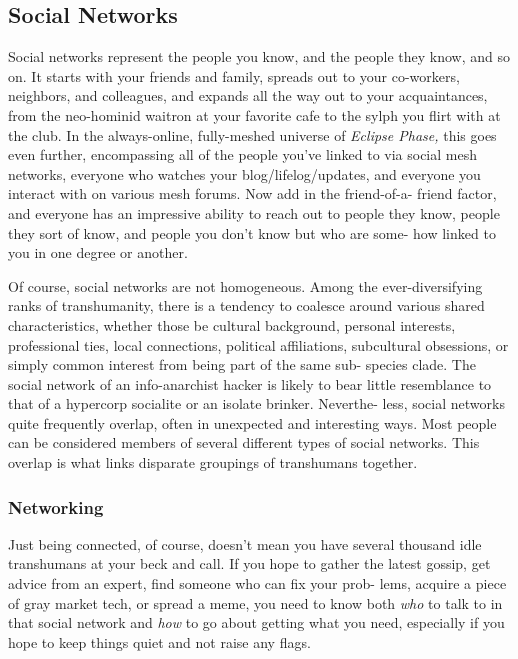 \subsection{Social Networks}

Social networks represent the people you know, and 
the people they know, and so on. It starts with your 
friends and family, spreads out to your co-workers, 
neighbors, and colleagues, and expands all the way 
out to your acquaintances, from the neo-hominid 
waitron at your favorite cafe to the sylph you flirt 
with at the club. In the always-online, fully-meshed 
universe of \textit{Eclipse Phase,} this goes even further, 
encompassing all of the people you've linked to via 
social mesh networks, everyone who watches your 
blog/lifelog/updates, and everyone you interact with 
on various mesh forums. Now add in the friend-of-a-
friend factor, and everyone has an impressive ability 
to reach out to people they know, people they sort of 
know, and people you don't know but who are some-
how linked to you in one degree or another.

Of course, social networks are not homogeneous. 
Among the ever-diversifying ranks of transhumanity, 
there is a tendency to coalesce around various shared 
characteristics, whether those be cultural background, 
personal interests, professional ties, local connections, 
political affiliations, subcultural obsessions, or simply 
common interest from being part of the same sub-
species clade. The social network of an info-anarchist 
hacker is likely to bear little resemblance to that of 
a hypercorp socialite or an isolate brinker. Neverthe-
less, social networks quite frequently overlap, often 
in unexpected and interesting ways. Most people can 
be considered members of several different types of 
social networks. This overlap is what links disparate 
groupings of transhumans together.

\subsubsection{Networking}

Just being connected, of course, doesn't mean you have 
several thousand idle transhumans at your beck and 
call. If you hope to gather the latest gossip, get advice 
from an expert, find someone who can fix your prob-
lems, acquire a piece of gray market tech, or spread a 
meme, you need to know both \textit{who} to talk to in that 
social network and \textit{how} to go about getting what you 
need, especially if you hope to keep things quiet and 
not raise any flags.

